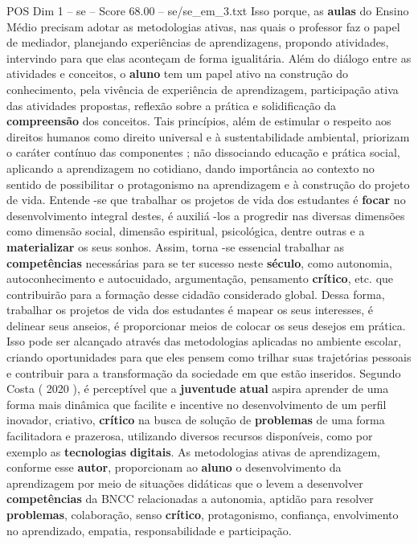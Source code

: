 \begin{textsample}{POS Dim 1 – se – Score 68.00 – se/se\_em\_3.txt}
Isso porque, as \textbf{aulas} do Ensino Médio precisam adotar as metodologias ativas, nas quais o professor faz o papel de mediador, planejando experiências de aprendizagens, propondo atividades, intervindo para que elas aconteçam de forma igualitária.
Além do diálogo entre as atividades e conceitos, o \textbf{aluno} tem um papel ativo na construção do conhecimento, pela vivência de experiência de aprendizagem, participação ativa das atividades propostas, reflexão sobre a prática e solidificação da \textbf{compreensão} dos conceitos.
Tais princípios, além de estimular o respeito aos direitos humanos como direito universal e à sustentabilidade ambiental, priorizam o caráter contínuo das componentes ; não dissociando educação e prática social, aplicando a aprendizagem no cotidiano, dando importância ao contexto no sentido de possibilitar o protagonismo na aprendizagem e à construção do projeto de vida.
Entende -se que trabalhar os projetos de vida dos estudantes é \textbf{focar} no desenvolvimento integral destes, é auxiliá -los a progredir nas diversas dimensões como dimensão social, dimensão espiritual, psicológica, dentre outras e a \textbf{materializar} os seus sonhos.
Assim, torna -se essencial trabalhar as \textbf{competências} necessárias para se ter sucesso neste \textbf{século}, como autonomia, autoconhecimento e autocuidado, argumentação, pensamento \textbf{crítico}, etc. que contribuirão para a formação desse cidadão considerado global.
Dessa forma, trabalhar os projetos de vida dos estudantes é mapear os seus interesses, é delinear seus anseios, é proporcionar meios de colocar os seus desejos em prática.
Isso pode ser alcançado através das metodologias aplicadas no ambiente escolar, criando oportunidades para que eles pensem como trilhar suas trajetórias pessoais e contribuir para a transformação da sociedade em que estão inseridos.
Segundo Costa ( 2020 ), é perceptível que a \textbf{juventude} \textbf{atual} aspira aprender de uma forma mais dinâmica que facilite e incentive no desenvolvimento de um perfil inovador, criativo, \textbf{crítico} na busca de solução de \textbf{problemas} de uma forma facilitadora e prazerosa, utilizando diversos recursos disponíveis, como por exemplo as \textbf{tecnologias} \textbf{digitais}.
As metodologias ativas de aprendizagem, conforme esse \textbf{autor}, proporcionam ao \textbf{aluno} o desenvolvimento da aprendizagem por meio de situações didáticas que o levem a desenvolver \textbf{competências} da BNCC relacionadas a autonomia, aptidão para resolver \textbf{problemas}, colaboração, senso \textbf{crítico}, protagonismo, confiança, envolvimento no aprendizado, empatia, responsabilidade e participação.

\end{textsample}
